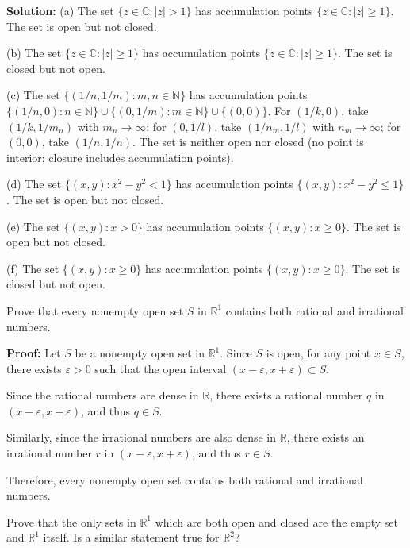 \textbf{Solution:}
(a) The set $\{z \in \mathbb{C} : |z| > 1\}$ has accumulation points $\{z \in \mathbb{C} : |z| \geq 1\}$. The set is open but not closed.

(b) The set $\{z \in \mathbb{C} : |z| \geq 1\}$ has accumulation points $\{z \in \mathbb{C} : |z| \geq 1\}$. The set is closed but not open.

(c) The set $\{(1/n, 1/m) : m,n \in \mathbb{N}\}$ has accumulation points $\{(1/n, 0) : n \in \mathbb{N}\} \cup \{(0, 1/m) : m \in \mathbb{N}\} \cup \{(0, 0)\}$. For $(1/k, 0)$, take $(1/k, 1/m_n)$ with $m_n \to \infty$; for $(0, 1/l)$, take $(1/n_m, 1/l)$ with $n_m \to \infty$; for $(0, 0)$, take $(1/n, 1/n)$. The set is neither open nor closed (no point is interior; closure includes accumulation points).

(d) The set $\{(x,y) : x^2 - y^2 < 1\}$ has accumulation points $\{(x,y) : x^2 - y^2 \leq 1\}$. The set is open but not closed.

(e) The set $\{(x,y) : x > 0\}$ has accumulation points $\{(x,y) : x \geq 0\}$. The set is open but not closed.

(f) The set $\{(x,y) : x \geq 0\}$ has accumulation points $\{(x,y) : x \geq 0\}$. The set is closed but not open.

\begin{problembox}
Prove that every nonempty open set $S$ in $\mathbb{R}^1$ contains both rational and irrational numbers.
\end{problembox}

\textbf{Proof:} Let $S$ be a nonempty open set in $\mathbb{R}^1$. Since $S$ is open, for any point $x \in S$, there exists $\varepsilon > 0$ such that the open interval $(x-\varepsilon, x+\varepsilon) \subset S$.

Since the rational numbers are dense in $\mathbb{R}$, there exists a rational number $q$ in $(x-\varepsilon, x+\varepsilon)$, and thus $q \in S$.

Similarly, since the irrational numbers are also dense in $\mathbb{R}$, there exists an irrational number $r$ in $(x-\varepsilon, x+\varepsilon)$, and thus $r \in S$.

Therefore, every nonempty open set contains both rational and irrational numbers.

\begin{problembox}
Prove that the only sets in $\mathbb{R}^1$ which are both open and closed are the empty set and $\mathbb{R}^1$ itself. Is a similar statement true for $\mathbb{R}^2$?
\end{problembox}

